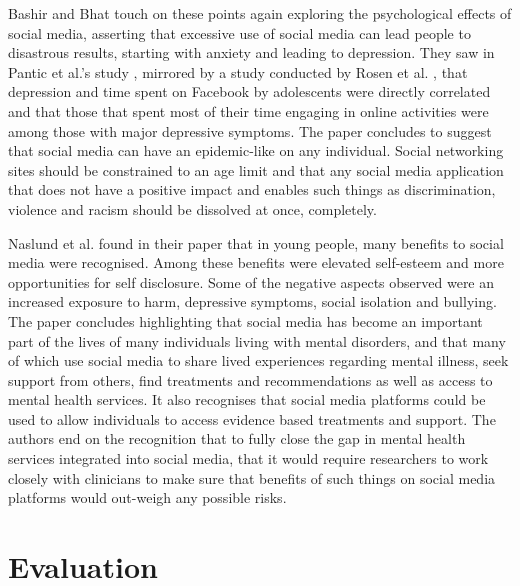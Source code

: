 \documentclass[lettersize,journal]{IEEEtran}
\begin{document}
    Bashir and Bhat \cite{Bashir et al 2017} touch on these points again exploring the psychological effects
    of social media, asserting that excessive use of social media can lead people to disastrous results, starting
    with anxiety and leading to depression. They saw in Pantic et al.'s study \cite{Pantic et al 2012}, mirrored
    by a study conducted by Rosen et al. \cite{Rosen et al 2013}, that depression and time spent on Facebook by
    adolescents were directly correlated and that those that spent most of their time engaging in online activities
    were among those with major depressive symptoms. The paper concludes to suggest that social media can have an
    epidemic-like on any individual. Social networking sites should be constrained to an age limit and that any
    social media application that does not have a positive impact and enables such things as discrimination, violence
    and racism should be dissolved at once, completely.

    Naslund et al. \cite{Naslund et al 2020} found in their paper that in young people, many benefits to social
    media were recognised. Among these benefits were elevated self-esteem and more opportunities for self
    disclosure. Some of the negative aspects observed were an increased exposure to harm, depressive symptoms,
    social isolation and bullying. The paper concludes highlighting that social media has become an important part
    of the lives of many individuals living with mental disorders, and that many of which use social media to share
    lived experiences regarding mental illness, seek support from others, find treatments and recommendations as
    well as access to mental health services. It also recognises that social media platforms could be used to
    allow individuals to access evidence based treatments and support. The authors end on the recognition that to
    fully close the gap in mental health services integrated into social media, that it would require researchers
    to work closely with clinicians to make sure that benefits of such things on social media platforms would
    out-weigh any possible risks.
\section{Evaluation}
\end{document}
